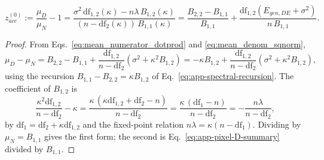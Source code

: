 \begin{lem}
\label{lem:app-z-closed-form}
\begin{equation}
z^{(0)}_{acc}:=\frac{\mu_D}{\mu_N}-1
=\frac{\sigma^2\,\mathrm{df}_{1,2}(\kappa)-n\lambda\,B_{1,2}(\kappa)}{(n-\mathrm{df}_2(\kappa))\,B_{1,1}(\kappa)}
=\frac{B_{2,2}-B_{1,1}}{B_{1,1}}+\frac{\mathrm{df}_{1,2}(E_{gen,DE}+\sigma^2)}{n\,B_{1,1}} .
\label{eq:z_simplify_identity}
\end{equation}
\end{lem}
\begin{proof}
From Eqs.~\ref{eq:mean_numerator_dotprod} and \ref{eq:mean_denom_sqnorm},
\[
\mu_D-\mu_N=B_{2,2}-B_{1,1}+\frac{\mathrm{df}_{1,2}}{n-\mathrm{df}_2}(\sigma^2+\kappa^2B_{1,2})
=-\kappa B_{1,2}+\frac{\mathrm{df}_{1,2}}{n-\mathrm{df}_2}(\sigma^2+\kappa^2B_{1,2}),
\]
using the recursion $B_{1,1}-B_{2,2}=\kappa B_{1,2}$ of
Eq.~\ref{eq:app-spectral-recursion}.  The coefficient of $B_{1,2}$ is
\[
\frac{\kappa^2\mathrm{df}_{1,2}}{n-\mathrm{df}_2}-\kappa
=\frac{\kappa\,(\kappa\mathrm{df}_{1,2}+\mathrm{df}_2-n)}{n-\mathrm{df}_2}
=\frac{\kappa\,(\mathrm{df}_1-n)}{n-\mathrm{df}_2}
=-\frac{n\lambda}{n-\mathrm{df}_2},
\]
by $\mathrm{df}_1=\mathrm{df}_2+\kappa\mathrm{df}_{1,2}$ and the fixed-point
relation $n\lambda=\kappa(n-\mathrm{df}_1)$.  Dividing by $\mu_N=B_{1,1}$
gives the first form; the second is
Eq.~\ref{eq:app-pixel-D-summary} divided by $B_{1,1}$.
\end{proof}

